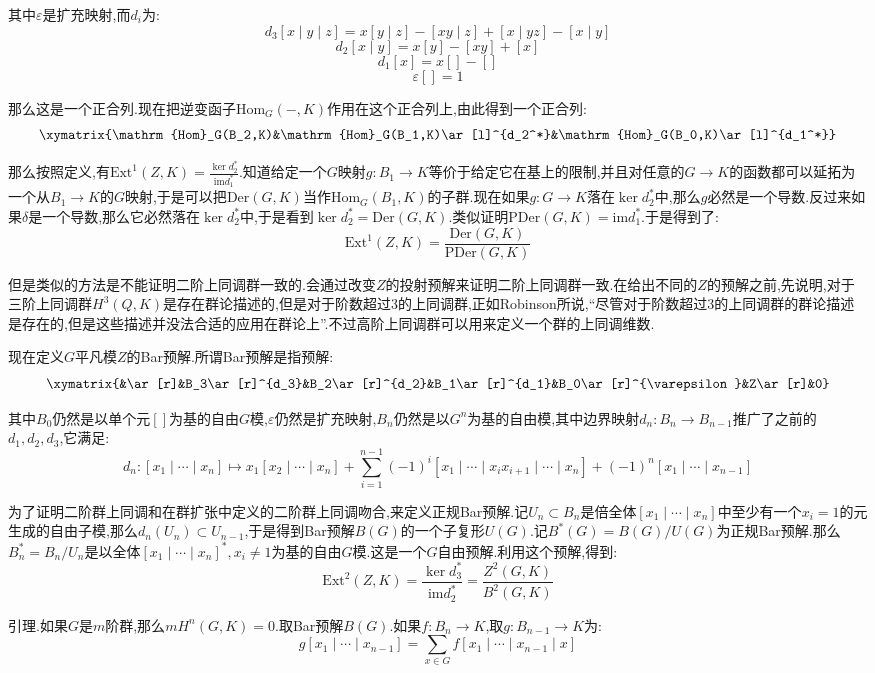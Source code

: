 其中$\varepsilon$是扩充映射,而$d_i$为:
$$d_3[x\mid y\mid z]=x[y\mid z]-[xy\mid z]+[x\mid yz]-[x\mid y]$$
$$d_2[x\mid y]=x[y]-[xy]+[x]$$
$$d_1[x]=x[]-[]$$
$$\varepsilon[]=1$$

那么这是一个正合列.现在把逆变函子$\mathrm{Hom}_G(-,K)$作用在这个正合列上,由此得到一个正合列:
$$\xymatrix{\mathrm{Hom}_G(B_2,K)&\mathrm{Hom}_G(B_1,K)\ar[l]^{d_2^*}&\mathrm{Hom}_G(B_0,K)\ar[l]^{d_1^*}}$$

那么按照定义,有$\mathrm{Ext}^1(Z,K)=\frac{\ker d_2^*}{\mathrm{im}d_1^*}$.知道给定一个$G$映射$g:B_1\to K$等价于给定它在基上的限制,并且对任意的$G\to K$的函数都可以延拓为一个从$B_1\to K$的$G$映射,于是可以把$\mathrm{Der}(G,K)$当作$\mathrm{Hom} _G(B_1,K)$的子群.现在如果$g:G\to K$落在$\ker d_2^*$中,那么$g$必然是一个导数.反过来如果$\delta$是一个导数,那么它必然落在$\ker d_2^*$中,于是看到$\ker d_2^*=\mathrm{Der}(G,K)$.类似证明$\mathrm{PDer}(G,K)=\mathrm{im}d_1^*$.于是得到了:
$$\mathrm{Ext}^1(Z,K)=\frac{\mathrm{Der}(G,K)}{\mathrm{PDer}(G,K)}$$

但是类似的方法是不能证明二阶上同调群一致的.会通过改变$Z$的投射预解来证明二阶上同调群一致.在给出不同的$Z$的预解之前,先说明,对于三阶上同调群$H^3(Q,K)$是存在群论描述的,但是对于阶数超过3的上同调群,正如Robinson所说,“尽管对于阶数超过3的上同调群的群论描述是存在的,但是这些描述并没法合适的应用在群论上”.不过高阶上同调群可以用来定义一个群的上同调维数.

现在定义$G$平凡模$Z$的Bar预解.所谓Bar预解是指预解:
$$\xymatrix{&\ar[r]&B_3\ar[r]^{d_3}&B_2\ar[r]^{d_2}&B_1\ar[r]^{d_1}&B_0\ar[r]^{\varepsilon}&Z\ar[r]&0}$$

其中$B_0$仍然是以单个元$[]$为基的自由$G$模,$\varepsilon$仍然是扩充映射,$B_n$仍然是以$G^n$为基的自由模,其中边界映射$d_n:B_n\to B_{n-1}$推广了之前的$d_1,d_2,d_3$,它满足:
$$d_n:[x_1\mid\cdots\mid x_n]\mapsto x_1[x_2\mid\cdots\mid x_n]
+\sum_{i=1}^{n-1}(-1)^i[x_1\mid\cdots\mid x_ix_{i+1}\mid\cdots\mid x_n]+(-1)^n[x_1\mid\cdots\mid x_{n-1}]$$

为了证明二阶群上同调和在群扩张中定义的二阶群上同调吻合,来定义正规Bar预解.记$U_n\subset B_n$是倍全体$[x_1\mid\cdots\mid x_n]$中至少有一个$x_i=1$的元生成的自由子模,那么$d_n(U_n)\subset U_{n-1}$,于是得到Bar预解$B(G)$的一个子复形$U(G)$.记$B^*(G)=B(G)/U(G)$为正规Bar预解.那么$B_n^*=B_n/U_n$是以全体$[x_1\mid\cdots\mid x_n]^*,x_i\not=1$为基的自由$G$模.这是一个$G$自由预解.利用这个预解,得到:
$$\mathrm{Ext}^2(Z,K)=\frac{\ker d_3^*}{\mathrm{im} d_2^*}=\frac{Z^2(G,K)}{B^2(G,K)}$$

引理.如果$G$是$m$阶群,那么$mH^n(G,K)=0$.取Bar预解$B(G)$.如果$f:B_n\to K$,取$g:B_{n-1}\to K$为:$$g[x_1\mid\cdots\mid x_{n-1}]=\sum_{x\in G}f[x_1\mid\cdots\mid x_{n-1}\mid x]$$

